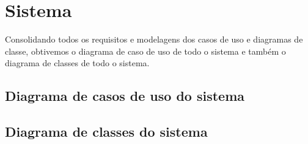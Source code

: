 \chapter[Sistema]{Sistema}

Consolidando todos os requisitos e modelagens dos casos de uso e diagramas de classe, obtivemos o diagrama de caso de uso de todo o sistema e também o diagrama de classes de todo o sistema.


\section{Diagrama de casos de uso do sistema}


\section{Diagrama de classes do sistema}
